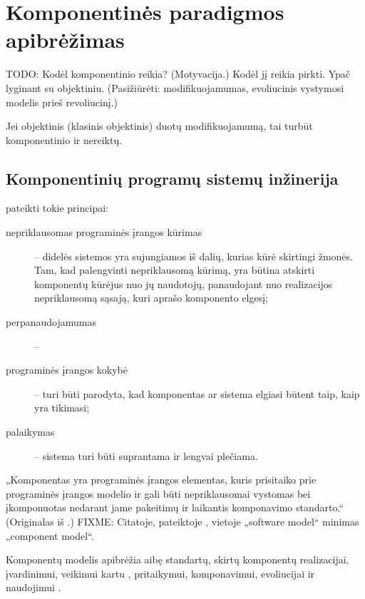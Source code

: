 \chapter{Komponentinės paradigmos apibrėžimas}

TODO: Kodėl komponentinio reikia? (Motyvacija.) Kodėl jį reikia pirkti.
Ypač lyginant su objektiniu. (Pasižiūrėti: modifikuojamumas,
evoliucinis vystymosi modelis prieš revoliucinį.)

Jei objektinis (klasinis objektinis) duotų modifikuojamumą, tai
turbūt komponentinio ir nereiktų.

\section{Komponentinių programų sistemų inžinerija}

\cite{analytical-study-cbse} pateikti tokie principai:
\begin{description}
  \item[nepriklausomas programinės įrangos kūrimas]  – didelės sistemos yra sujungiamos iš dalių,
    kurias kūrė skirtingi žmonės. Tam, kad palengvinti nepriklausomą
    kūrimą, yra būtina atskirti komponentų kūrėjus nuo jų naudotojų,
    panaudojant nuo realizacijos nepriklausomą sąsają, kuri aprašo
    komponento elgesį;
  \item[perpanaudojamumas]  – 
  \item[programinės įrangos kokybė]  – turi
    būti parodyta, kad komponentas ar sistema elgiasi būtent taip, kaip
    yra tikimasi;
  \item[palaikymas]  – sistema turi būti suprantama
    ir lengvai plečiama.
\end{description}

„Komponentas yra programinės įrangos elementas, kuris prisitaiko prie
programinės įrangos modelio ir gali būti nepriklausomai vystomas
bei įkomponuotas nedarant jame pakeitimų ir laikantis komponavimo
standarto.“\cite[438]{analytical-study-cbse} (Originalas iš
\cite{heineman2001component}.)
FIXME: Citatoje, pateiktoje \cite{classification-framework-for-scm},
vietoje „software model“ minimas „component model“.

\begin{defn}
  Komponentų modelis apibrėžia aibę standartų, skirtų komponentų
  realizacijai, įvardinimui, veikimui kartu ,
  pritaikymui, komponavimui, evoliucijai ir naudojimui .
\end{defn}

